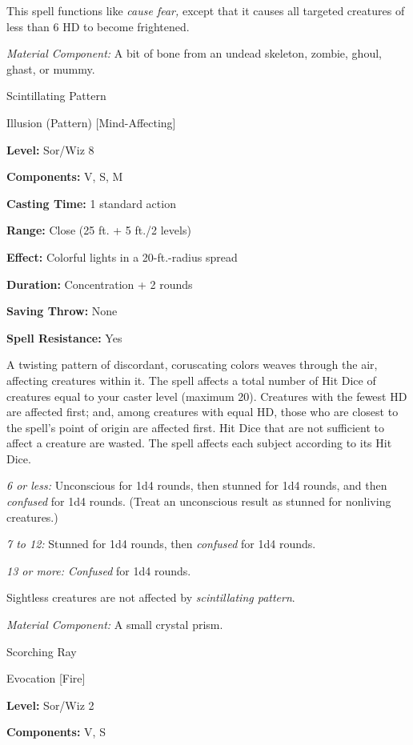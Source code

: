 \documentclass{article}
\begin{document}
This spell functions like \textit{cause fear, }except that it causes all targeted 
creatures of less than 6 HD to become frightened.

\textit{Material Component: }A bit of bone from an undead skeleton, zombie, ghoul, 
ghast, or mummy.

\vspace{12pt}
Scintillating Pattern

Illusion (Pattern) [Mind-Affecting]

\textbf{Level:} Sor/Wiz 8

\textbf{Components:} V, S, M

\textbf{Casting Time:} 1 standard action

\textbf{Range:} Close (25 ft. + 5 ft./2 levels)

\textbf{Effect:} Colorful lights in a 20-ft.-radius spread

\textbf{Duration:} Concentration + 2 rounds

\textbf{Saving Throw:} None

\textbf{Spell Resistance:} Yes

A twisting pattern of discordant, coruscating colors weaves through the air, affecting 
creatures within it. The spell affects a total number of Hit Dice of creatures 
equal to your caster level (maximum 20). Creatures with the fewest HD are affected 
first; and, among creatures with equal HD, those who are closest to the spell's 
point of origin are affected first. Hit Dice that are not sufficient to affect 
a creature are wasted. The spell affects each subject according to its Hit Dice.

\textit{6 or less: }Unconscious for 1d4 rounds, then stunned for 1d4 rounds, and 
then \textit{confused }for 1d4 rounds. (Treat an unconscious result as stunned 
for nonliving creatures.)

\textit{7 to 12: }Stunned for 1d4 rounds, then \textit{confused }for 1d4 rounds. 

\textit{13 or more: Confused }for 1d4 rounds. 

Sightless creatures are not affected by \textit{scintillating pattern}.

\textit{Material Component: }A small crystal prism.

\vspace{12pt}
Scorching Ray

Evocation [Fire]

\textbf{Level:} Sor/Wiz 2

\textbf{Components:} V, S
\end{document}

